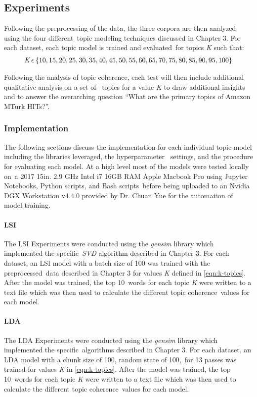 \documentclass[letterpaper,12pt]{article}
\begin{document}
\subsection{Experiments}
Following the preprocessing of the data, the three corpora are then analyzed using the four different\
topic modeling techniques discussed in Chapter 3. For each dataset, each topic model is trained and evaluated\
for topics \emph{K} such that:
\begin{eqnarray}
	\label{eqn:k-topics}
	\emph{K} \: \epsilon \: \{ 10, 15, 20, 25, 30, 35, 40, 45, 50, 55, 60, 65, 70, 75, 80, 85, 90, 95, 100 \}
\end{eqnarray}

Following the analysis of topic coherence, each test will then include additional qualitative analysis on a set of \
 topics for a value \emph{K} to draw additional insights and to answer the overarching question ``What are the primary topics of Amazon MTurk HITs?''.
\subsubsection{Implementation}
The following sections discuss the implementation for each individual topic model including the libraries leveraged, the hyperparameter \
settings, and the procedure for evaluating each model. At a high level most of the models were tested locally on\
a 2017 15in. 2.9 GHz Intel i7 16GB RAM Apple Macbook Pro using Jupyter Notebooks, Python scripts, and Bash scripts\
before being uploaded to an Nvidia DGX Workstation v4.4.0 provided by Dr. Chuan Yue for the automation of model training. 
\paragraph{LSI}
The LSI Experiments were conducted using the \emph{gensim} library \cite{gensim} which implemented the specific\
\emph{SVD} algorithm described in Chapter 3. For each dataset, an LSI model with a batch size of 100 was trained with the preprocessed\
data described in Chapter 3 for values \emph{K} defined in \ref{eqn:k-topics}. After the model was trained, the top 10\
words for each topic \emph{K} were written to a text file which was then used to calculate the different topic coherence\
values for each model.

\paragraph{LDA}
The LDA Experiments were conducted using the \emph{gensim} library \cite{gensim} which implemented the specific\
algorithms described in Chapter 3. For each dataset, an LDA model with a chunk size of 100, random state of 100,\
for 13 passes was trained for values \emph{K} in \ref{eqn:k-topics}. After the model was trained, the top 10\
words for each topic \emph{K} were written to a text file which was then used to calculate the different topic coherence\
values for each model.
\end{document}
